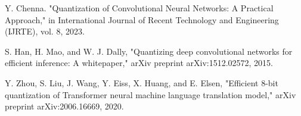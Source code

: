 \documentclass[lettersize,journal]{IEEEtran}
\begin{document}
\begin{thebibliography}{00}
    Y. Chenna. "Quantization of Convolutional Neural Networks: A Practical Approach," in International Journal of Recent Technology and Engineering (ĲRTE), vol. 8, 2023.

    S. Han, H. Mao, and W. J. Dally, "Quantizing deep convolutional networks for efficient inference: A whitepaper," arXiv preprint arXiv:1512.02572, 2015.

    Y. Zhou, S. Liu, J. Wang, Y. Eiss, X. Huang, and E. Elsen, "Efficient 8-bit quantization of Transformer neural machine language translation model," arXiv preprint arXiv:2006.16669, 2020.
\end{thebibliography}
\end{document}
